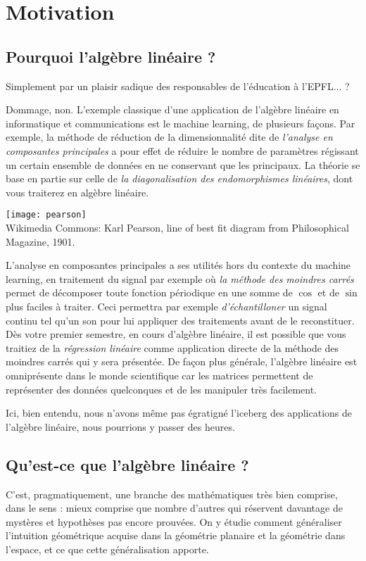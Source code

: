                                               \chapter{Motivation}

\section{Pourquoi l'algèbre linéaire ?}
Simplement par un plaisir sadique des responsables de l'éducation à l'EPFL... ?

Dommage, non. L'exemple classique d'une application de l'algèbre linéaire en informatique et communications est le machine learning, de plusieurs façons. Par exemple, la méthode de réduction de la dimensionnalité dite de \textit{l'analyse en composantes principales} a pour effet de réduire le nombre de paramètres régissant un certain ensemble de données en ne conservant que les principaux. La théorie se base en partie sur celle de \textit{la diagonalisation des endomorphismes linéaires}, dont vous traiterez en algèbre linéaire.
\begin{center}
    \texttt{[image: pearson]}\\
    Wikimedia Commons: Karl Pearson, line of best fit diagram from Philosophical Magazine, 1901.
\end{center}
L'analyse en composantes principales a ses utilités hors du contexte du machine learning, en traitement du signal par exemple où \textit{la méthode des moindres carrés} permet de décomposer toute fonction périodique en une somme de $\cos$ et de $\sin$ plus faciles à traiter. Ceci permettra par exemple \textit{d'échantilloner} un signal continu tel qu'un son pour lui appliquer des traitements avant de le reconstituer. Dès votre premier semestre, en cours d'algèbre linéaire, il est possible que vous traitiez de la \textit{régression linéaire} comme application directe de la méthode des moindres carrés qui y sera présentée. De façon plus générale, l'algèbre linéaire est omniprésente dans le monde scientifique car les matrices permettent de représenter des données quelconques et de les manipuler très facilement.

\noindent Ici, bien entendu, nous n'avons même pas égratigné l'iceberg des applications de l'algèbre linéaire, nous pourrions y passer des heures.

\section{Qu'est-ce que l'algèbre linéaire ?}
C'est, pragmatiquement, une branche des mathématiques très bien comprise, dans le sens : mieux comprise que nombre d'autres qui réservent davantage de mystères et hypothèses pas encore prouvées. On y étudie comment généraliser l'intuition géométrique acquise dans la géométrie planaire et la géométrie dans l'espace, et ce que cette généralisation apporte.\\

